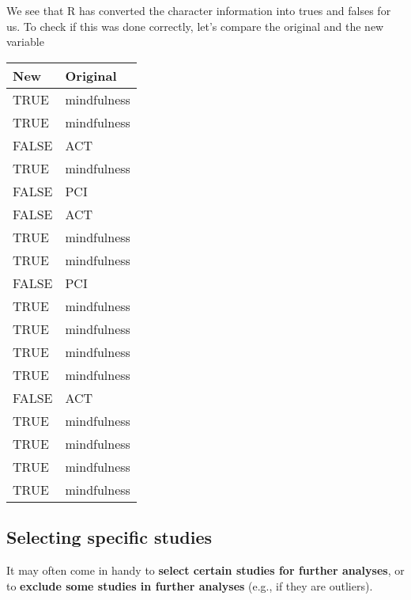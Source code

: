 \documentclass[]{book}
\newenvironment{Shaded}{\begin{snugshade}}{\end{snugshade}}
\newcommand{\KeywordTok}[1]{\textcolor[rgb]{0.13,0.29,0.53}{\textbf{#1}}}
\newcommand{\DataTypeTok}[1]{\textcolor[rgb]{0.13,0.29,0.53}{#1}}
\newcommand{\StringTok}[1]{\textcolor[rgb]{0.31,0.60,0.02}{#1}}
\newcommand{\OperatorTok}[1]{\textcolor[rgb]{0.81,0.36,0.00}{\textbf{#1}}}
\newcommand{\NormalTok}[1]{#1}
\theoremstyle{definition}
\theoremstyle{definition}
\theoremstyle{definition}
\theoremstyle{remark}
\begin{document}
We see that R has converted the character information into trues and
falses for us. To check if this was done correctly, let's compare the
original and the new variable

\begin{Shaded}
\end{Shaded}

\begin{tabular}{l|l}
\hline
New & Original\\
\hline
TRUE & mindfulness\\
\hline
TRUE & mindfulness\\
\hline
FALSE & ACT\\
\hline
TRUE & mindfulness\\
\hline
FALSE & PCI\\
\hline
FALSE & ACT\\
\hline
TRUE & mindfulness\\
\hline
TRUE & mindfulness\\
\hline
FALSE & PCI\\
\hline
TRUE & mindfulness\\
\hline
TRUE & mindfulness\\
\hline
TRUE & mindfulness\\
\hline
TRUE & mindfulness\\
\hline
FALSE & ACT\\
\hline
TRUE & mindfulness\\
\hline
TRUE & mindfulness\\
\hline
TRUE & mindfulness\\
\hline
TRUE & mindfulness\\
\hline
\end{tabular}

\subsection{Selecting specific
studies}\label{selecting-specific-studies}

It may often come in handy to \textbf{select certain studies for further
analyses}, or to \textbf{exclude some studies in further analyses}
(e.g., if they are outliers).
\end{document}
